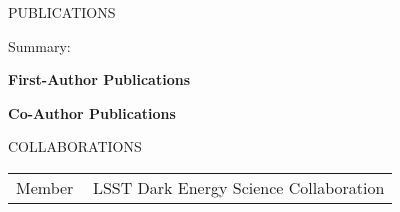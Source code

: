 \documentclass[11pt]{article} %
\begin{document}

\begin{section}{PUBLICATIONS}

Summary: 
    
\textbf{First-Author Publications}
\begin{enumerate}[leftmargin=1.5em]
     
\end{enumerate}

\textbf{Co-Author Publications}
\begin{enumerate}[leftmargin=1.5em]
     
\end{enumerate}

\end{section} 

\begin{section}{COLLABORATIONS}

\begin{tabular}{@{}p{0.2\linewidth}@{}p{0.8\linewidth}@{}}
    Member &LSST Dark Energy Science Collaboration \\
\end{tabular}

\end{section}
\end{document}
